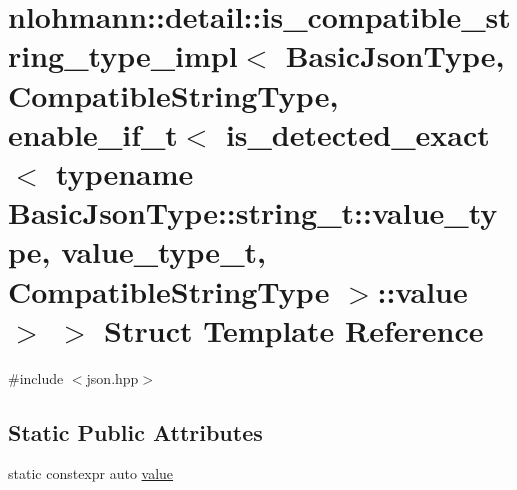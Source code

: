 \hypertarget{structnlohmann_1_1detail_1_1is__compatible__string__type__impl_3_01_basic_json_type_00_01_compat6590904cab40fc73f430e4c7518179a2}{}\section{nlohmann\+::detail\+::is\+\_\+compatible\+\_\+string\+\_\+type\+\_\+impl$<$ Basic\+Json\+Type, Compatible\+String\+Type, enable\+\_\+if\+\_\+t$<$ is\+\_\+detected\+\_\+exact$<$ typename Basic\+Json\+Type\+::string\+\_\+t\+::value\+\_\+type, value\+\_\+type\+\_\+t, Compatible\+String\+Type $>$\+::value $>$ $>$ Struct Template Reference}
\label{structnlohmann_1_1detail_1_1is__compatible__string__type__impl_3_01_basic_json_type_00_01_compat6590904cab40fc73f430e4c7518179a2}


{\ttfamily \#include $<$json.\+hpp$>$}

\subsection*{Static Public Attributes}
\begin{DoxyCompactItemize}
\item 
static constexpr auto \mbox{\hyperlink{structnlohmann_1_1detail_1_1is__compatible__string__type__impl_3_01_basic_json_type_00_01_compat6590904cab40fc73f430e4c7518179a2_adac1e17a2ddf9ac94be736e96e8943a9}{value}}
\end{DoxyCompactItemize}


